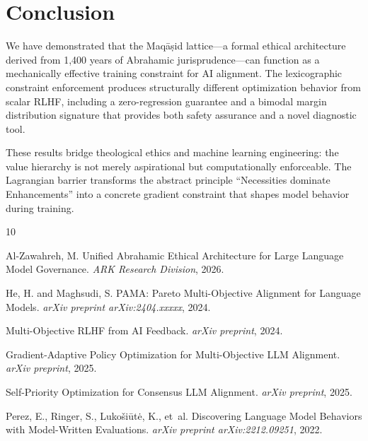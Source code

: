 \documentclass[11pt,a4paper]{article}
\begin{document}
\section{Conclusion}

We have demonstrated that the Maq\=a\d{s}id lattice---a formal ethical architecture derived from 1,400 years of Abrahamic jurisprudence---can function as a mechanically effective training constraint for AI alignment. The lexicographic constraint enforcement produces structurally different optimization behavior from scalar RLHF, including a zero-regression guarantee and a bimodal margin distribution signature that provides both safety assurance and a novel diagnostic tool.

These results bridge theological ethics and machine learning engineering: the value hierarchy is not merely aspirational but computationally enforceable. The Lagrangian barrier transforms the abstract principle ``Necessities dominate Enhancements'' into a concrete gradient constraint that shapes model behavior during training.


\begin{thebibliography}{10}

Al-Zawahreh, M.
\newblock Unified Abrahamic Ethical Architecture for Large Language Model Governance.
\newblock \emph{ARK Research Division}, 2026.

He, H. and Maghsudi, S.
\newblock PAMA: Pareto Multi-Objective Alignment for Language Models.
\newblock \emph{arXiv preprint arXiv:2404.xxxxx}, 2024.

Multi-Objective RLHF from AI Feedback.
\newblock \emph{arXiv preprint}, 2024.

Gradient-Adaptive Policy Optimization for Multi-Objective LLM Alignment.
\newblock \emph{arXiv preprint}, 2025.

Self-Priority Optimization for Consensus LLM Alignment.
\newblock \emph{arXiv preprint}, 2025.

Perez, E., Ringer, S., Luko\v{s}i\={u}t\.{e}, K., et~al.
\newblock Discovering Language Model Behaviors with Model-Written Evaluations.
\newblock \emph{arXiv preprint arXiv:2212.09251}, 2022.

\end{thebibliography}
\end{document}
